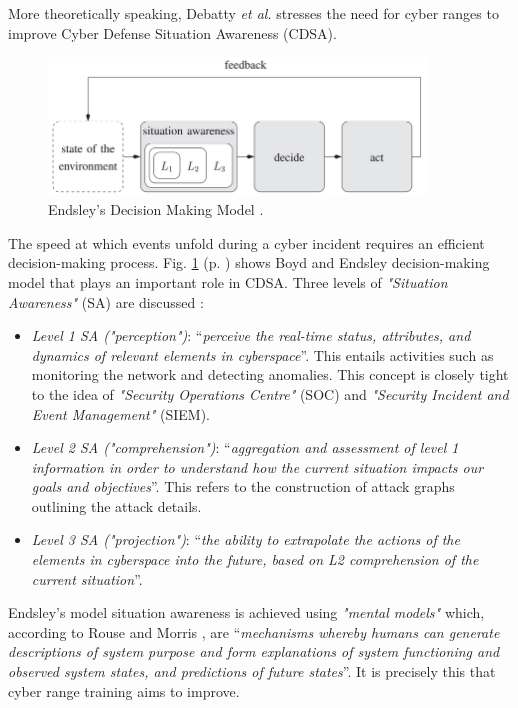 More theoretically speaking, Debatty \textit{et al.} \cite{building_cr_ref} stresses the need for cyber ranges to improve Cyber Defense Situation Awareness (CDSA). 

\begin{figure}[H]
    \includegraphics[width=10cm]{figures/building_cr_endsley_model.png}
    \caption{Endsley's Decision Making Model \cite{endsley_ref}.}
    \label{fig:endsley_decision_making_model}
\end{figure}

The speed at which events unfold during a cyber incident requires an efficient decision-making process. Fig. \ref{fig:endsley_decision_making_model} (p. \pageref{fig:endsley_decision_making_model}) shows Boyd and Endsley \cite{endsley_ref} decision-making model that plays an important role in CDSA. Three levels of \textit{"Situation Awareness"} (SA) are discussed \cite{building_cr_ref}:

\begin{itemize}
    \item \textit{Level 1 SA (\textit{"perception"})}: ``\textit{perceive the real-time status, attributes, and dynamics of relevant elements in cyberspace}''. This entails activities such as monitoring the network and detecting anomalies. This concept is closely tight to the idea of \textit{"Security Operations Centre"} (SOC) and \textit{"Security Incident and Event Management"} (SIEM).
    \item \textit{Level 2 SA (\textit{"comprehension"})}: ``\textit{aggregation and assessment of level 1 information in order to understand how the current situation impacts our goals and objectives}''. This refers to the construction of attack graphs outlining the attack details.
    \item \textit{Level 3 SA (\textit{"projection"})}: ``\textit{the ability to extrapolate the actions of the elements in cyberspace into the future, based on L2 comprehension of the current situation}''.
\end{itemize}

Endsley's model situation awareness is achieved using \textit{"mental models"} which, according to Rouse and Morris \cite{rouse_morris_ref}, are ``\textit{mechanisms whereby humans can generate descriptions of system purpose and form explanations of system functioning and observed system states, and predictions of future states}''. It is precisely this that cyber range training aims to improve.

